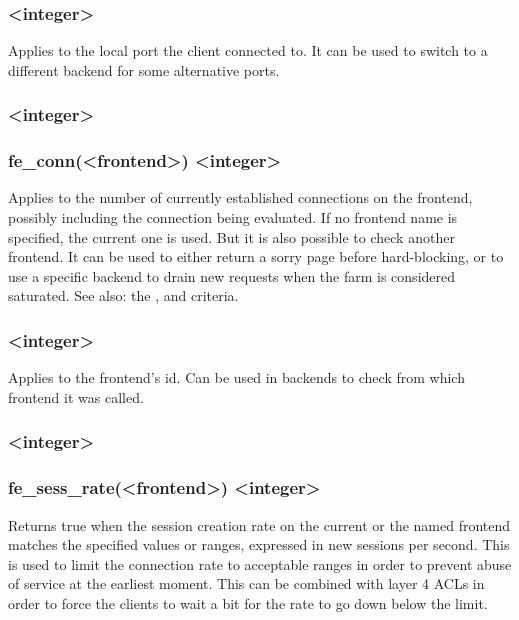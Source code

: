 \subsubsection[dst\_port]{ <integer>}
  Applies to the local port the client connected to. It can be used to switch
  to a different backend for some alternative ports.

\subsubsection[fe_conn]{ <integer>}
\subsubsection*{fe\_conn(<frontend>) <integer>}
  Applies to the number of currently established connections on the frontend,
  possibly including the connection being evaluated. If no frontend name is
  specified, the current one is used. But it is also possible to check another
  frontend. It can be used to either return a sorry page before hard-blocking,
  or to use a specific backend to drain new requests when the farm is
  considered saturated.
See also: the ,  and 
  criteria.

\subsubsection[fe\_id]{ <integer>}
  Applies to the frontend's id. Can be used in backends to check from which
  frontend it was called.

\subsubsection[fe\_sess\_rate]{ <integer>}
\subsubsection*{fe\_sess\_rate(<frontend>) <integer>}
  Returns true when the session creation rate on the current or the named
  frontend matches the specified values or ranges, expressed in new sessions
  per second. This is used to limit the connection rate to acceptable ranges in
  order to prevent abuse of service at the earliest moment. This can be
  combined with layer 4 ACLs in order to force the clients to wait a bit for
  the rate to go down below the limit.


